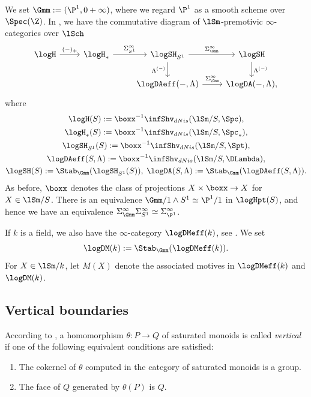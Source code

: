 \documentclass[10pt]{amsart}
\begin{document}
\begin{df}
We set $\Gmm:=(\P^1,0+\infty)$, where we regard $\P^1$ as a smooth scheme over $\Spec(\Z)$.
In \cite{logSH}, we have the commutative diagram of $\lSm$-premotivic $\infty$-categories over $\lSch$
\[
\begin{tikzcd}
\logH \ar[r,"(-)_+"]&
\logH_* \ar[r,"\Sigma_{S^1}^\infty"]&
\logSH_{S^1}\ar[r,"\Sigma_{\Gmm}^\infty"]\ar[d,"{\Lambda^{(-)}}"']&
\logSH\ar[d,"{\Lambda^{(-)}}"]
\\
&
&
\logDAeff(-,\Lambda)\ar[r,"\Sigma_{\Gmm}^\infty"]&
\logDA(-,\Lambda),
\end{tikzcd}
\]
where
\begin{gather*}
\logH(S)
:=
\boxx^{-1}\infShv_{dNis}(\lSm/S,\Spc),
\\
\logH_*(S)
:=
\boxx^{-1}\infShv_{dNis}(\lSm/S,\Spc_*),
\\
\logSH_{S^1}(S)
:=
\boxx^{-1}\infShv_{dNis}(\lSm/S,\Spt),
\\
\logDAeff(S,\Lambda)
:=
\boxx^{-1}\infShv_{dNis}(\lSm/S,\DLambda),
\\
\logSH(S)
:=
\Stab_{\Gmm}(\logSH_{S^1}(S)),
\;
\logDA(S,\Lambda)
:=
\Stab_{\Gmm}(\logDAeff(S,\Lambda)).
\end{gather*}
As before, $\boxx$ denotes the class of projections $X\times \boxx\to X$ for $X\in \lSm/S$.
There is an equivalence $\Gmm/1 \wedge S^1\simeq \P^1/1$ in $\logHpt(S)$, and hence we have an equivalence $\Sigma_{\Gmm}^\infty \Sigma_{S^1}^\infty \simeq \Sigma_{\P^1}^\infty$.

If $k$ is a field, we also have the $\infty$-category $\logDMeff(k)$, see \cite[Definition 5.2.1]{logDM}.
We set
\[
\logDM(k):=\Stab_{\Gmm}(\logDMeff(k)).
\]
For $X\in \lSm/k$, let $M(X)$ denote the associated motives in $\logDMeff(k)$ and $\logDM(k)$.
\end{df}

\subsection{Vertical boundaries}
\label{vertical_boundaries}

\begin{df}
According to \cite[Definition I.4.3.1, Remark I.4.3.2, Proposition I.4.3.3(3)]{Ogu}, a homomorphism $\theta\colon P\to Q$ of saturated monoids is called \emph{vertical} if one of the following equivalent conditions are satisfied:
\begin{enumerate}
\item[(i)] The cokernel of $\theta$ computed in the category of saturated monoids is a group.
\item[(ii)] The face of $Q$ generated by $\theta(P)$ is $Q$.
\end{enumerate}
\end{df}
\end{document}
